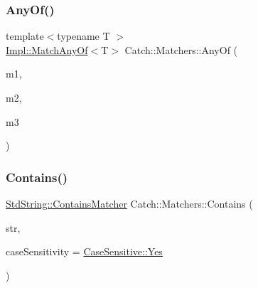 \mbox{\label{namespace_catch_1_1_matchers_a37055a4e76b2aa356b17a508a806a445}} 
\subsubsection{\texorpdfstring{Any\+Of()}{AnyOf()}\hspace{0.1cm}{\footnotesize\ttfamily [2/2]}}
{\footnotesize\ttfamily template$<$typename T $>$ \\
\mbox{\hyperlink{struct_catch_1_1_matchers_1_1_impl_1_1_match_any_of}{Impl\+::\+Match\+Any\+Of}}$<$T$>$ Catch\+::\+Matchers\+::\+Any\+Of (\begin{DoxyParamCaption}\item[{\mbox{\hyperlink{struct_catch_1_1_matchers_1_1_impl_1_1_matcher_base}{Impl\+::\+Matcher\+Base}}$<$ T $>$ const \&}]{m1,  }\item[{\mbox{\hyperlink{struct_catch_1_1_matchers_1_1_impl_1_1_matcher_base}{Impl\+::\+Matcher\+Base}}$<$ T $>$ const \&}]{m2,  }\item[{\mbox{\hyperlink{struct_catch_1_1_matchers_1_1_impl_1_1_matcher_base}{Impl\+::\+Matcher\+Base}}$<$ T $>$ const \&}]{m3 }\end{DoxyParamCaption})\hspace{0.3cm}{\ttfamily [inline]}}

\mbox{\label{namespace_catch_1_1_matchers_a1f6c2accdc6cd75a84d7112dcad647b4}} 
\subsubsection{\texorpdfstring{Contains()}{Contains()}\hspace{0.1cm}{\footnotesize\ttfamily [1/2]}}
{\footnotesize\ttfamily \mbox{\hyperlink{struct_catch_1_1_matchers_1_1_std_string_1_1_contains_matcher}{Std\+String\+::\+Contains\+Matcher}} Catch\+::\+Matchers\+::\+Contains (\begin{DoxyParamCaption}\item[{std\+::string const \&}]{str,  }\item[{\mbox{\hyperlink{struct_catch_1_1_case_sensitive_aad49d3aee2d97066642fffa919685c6a}{Case\+Sensitive\+::\+Choice}}}]{case\+Sensitivity = {\ttfamily \mbox{\hyperlink{struct_catch_1_1_case_sensitive_aad49d3aee2d97066642fffa919685c6aa7c5550b69ec3c502e6f609b67f9613c6}{Case\+Sensitive\+::\+Yes}}} }\end{DoxyParamCaption})}

